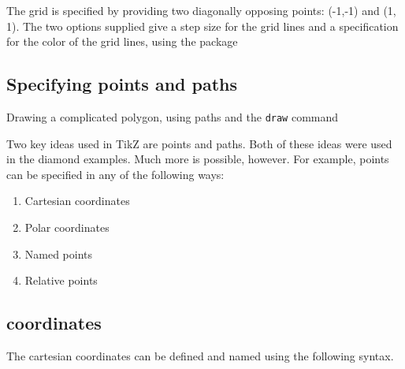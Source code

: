 \begin{teXXX}
\end{teXXX}

The grid is specified by providing two diagonally opposing points: (-1,-1)
and (1, 1). The two options supplied give a step size for the grid lines and a
specification for the color of the grid lines, using the  package

\subsection{Specifying points and paths}

\begin{marginfigure}
\begin{centering}
\caption{Drawing a complicated polygon, using paths and the \texttt{draw} command}
\end{centering}
\end{marginfigure}


Two key ideas used in TikZ are points and paths. Both of these ideas were used
in the diamond examples. Much more is possible, however. For example, points
can be specified in any of the following ways:
\begin{enumerate}
\item  Cartesian coordinates
\item  Polar coordinates
\item  Named points
\item  Relative points
\end{enumerate}

\subsection*{coordinates}
The cartesian coordinates can be defined and named using the following syntax.

